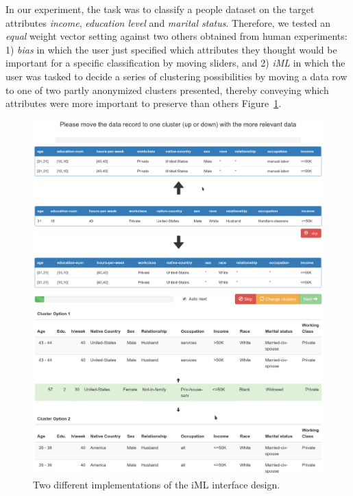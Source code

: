 \documentclass{llncs}
\begin{document}
In our experiment, the task was to classify a people dataset on the target attributes \textit{income}, \textit{education level} and \textit{marital status}. Therefore, we tested an \textit{equal} weight vector setting against two others obtained from human experiments: 1) \textit{bias} in which the user just specified which attributes they thought would be important for a specific classification by moving sliders, and 2) \textit{iML} in which the user was tasked to decide a series of clustering possibilities by moving a data row to one of two partly anonymized clusters presented, thereby conveying which attributes were more important to preserve than others Figure~\ref{fig:iml_UI}.

\begin{figure}[!h]
	\begin{center}
		\vspace{-1.0cm}
		\hspace*{-0.8cm}
		\includegraphics[width=1.0\textwidth]{figures/iml_anon_screen1}
		
		\vspace{1.0cm}
		\hspace*{-0.8cm}
		\includegraphics[width=1.0\textwidth]{figures/iml_anon_screen2}
		\caption{Two different implementations of the iML interface design.}
		\label{fig:iml_UI}
	\end{center}
\end{figure}
\end{document}
